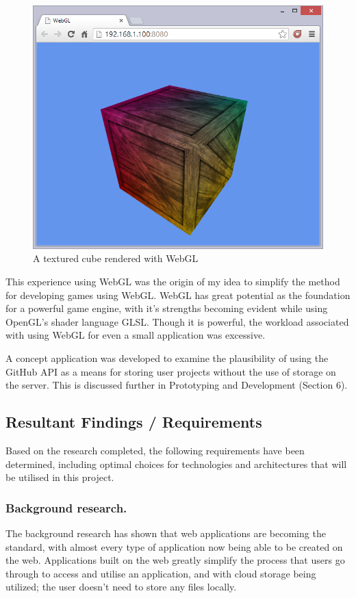 \documentclass[a4paper, 12pt]{article}
\begin{document}
\begin{figure}[h]
	\centering
	\includegraphics[scale=0.5]{webgl}
	\caption{A textured cube rendered with WebGL}
	\label{fig:webgl}
\end{figure}

This experience using WebGL was the origin of my idea to simplify the method for developing games using WebGL. WebGL has great potential as the foundation for a powerful game engine, with it's strengths becoming evident while using OpenGL's shader language GLSL. Though it is powerful, the workload associated with using WebGL for even a small application was excessive.

A concept application was developed to examine the plausibility of using the GitHub API as a means for storing user projects without the use of storage on the server. This is discussed further in Prototyping and Development (Section 6).

\subsection{Resultant Findings / Requirements}
Based on the research completed, the following requirements have been determined, including optimal choices for technologies and architectures that will be utilised in this project.

\subsubsection{Background research.}
The background research has shown that web applications are becoming the standard, with almost every type of application now being able to be created on the web. Applications built on the web greatly simplify the process that users go through to access and utilise an application, and with cloud storage being utilized; the user doesn't need to store any files locally.
\end{document}
